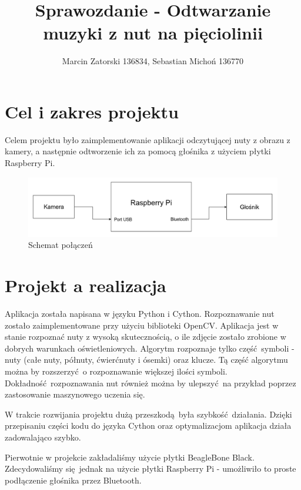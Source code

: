 \documentclass[12pt]{article}
\begin{document}
\title{Sprawozdanie - Odtwarzanie muzyki z nut na pięciolinii}
\author{Marcin Zatorski 136834, Sebastian Michoń 136770}
\date{\vspace{-2ex}}
\maketitle

\section{Cel i zakres projektu}
Celem projektu było zaimplementowanie aplikacji odczytującej nuty z obrazu z kamery, a następnie odtworzenie ich za pomocą głośnika z użyciem płytki Raspberry Pi.

\begin{figure}[h!]
	\centering
	\includegraphics[width=0.9\linewidth]{SW-schematic.png}
	\caption{Schemat połączeń}
	\label{fig:schemat}
\end{figure}
	
\section{Projekt a realizacja}
Aplikacja została napisana w języku Python i Cython. Rozpoznawanie nut zostało zaimplementowane przy użyciu biblioteki OpenCV. Aplikacja jest w stanie rozpoznać nuty z wysoką skutecznością, o ile zdjęcie zostało zrobione w dobrych warunkach oświetleniowych. Algorytm rozpoznaje tylko część symboli - nuty (całe nuty, półnuty, ćwierćnuty i ósemki) oraz klucze. Tą część algorytmu można by rozszerzyć o rozpoznawanie większej ilości symboli. Dokładność rozpoznawania nut również można by ulepszyć na przykład poprzez zastosowanie maszynowego uczenia się.
	
W trakcie rozwijania projektu dużą przeszkodą była szybkość działania. Dzięki przepisaniu części kodu do języka Cython oraz optymalizacjom aplikacja działa zadowalająco szybko.
	
Pierwotnie w projekcie zakładaliśmy użycie płytki BeagleBone Black. Zdecydowaliśmy się jednak na użycie płytki Raspberry Pi - umożliwiło to proste podłączenie głośnika przez Bluetooth.
	
\end{document}
